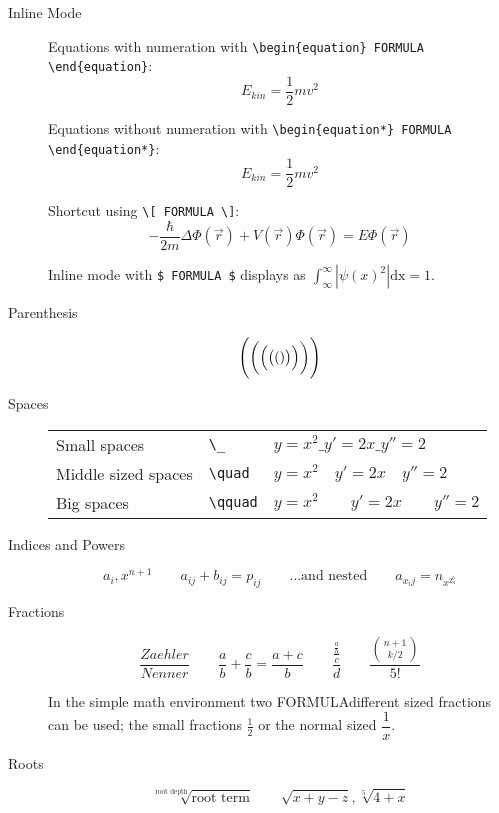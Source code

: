 \documentclass[10pt,a4paper]{scrartcl}
\begin{document}
\begin{description}

\item[Inline Mode]
Equations with numeration with \verb$\begin{equation} FORMULA \end{equation}$:
\begin{equation} 
E_{kin} = \frac 1 2 m v^2
\end{equation}

Equations without numeration with \verb$\begin{equation*} FORMULA \end{equation*}$:
\begin{equation*} 
E_{kin} = \frac 1 2 m v^2
\end{equation*}

Shortcut using \verb$\[ FORMULA \]$:
\[ -\frac{\hbar}{2m}\Delta\Phi(\vec r) + V(\vec r)\Phi(\vec r) = E\Phi(\vec r) \]

Inline mode with \verb|$ FORMULA $| displays as 
$\int_\infty^\infty |\psi(x)^2|\mathrm{dx} = 1$.

\item[Parenthesis]
\[ \Biggl( \biggl( \Bigl( \bigl( ( ) \bigr) \Bigr) \biggr) \Biggr) \]

\item[Spaces]
\begin{tabular}[t]{lll}
Small spaces        & \verb$\_$     & $ y=x^{2} \_ y'=2x \_  y''=2 $ \\
Middle sized spaces & \verb$\quad$  & $ y=x^{2} \quad y'=2x \quad  y''=2 $ \\
Big spaces          & \verb$\qquad$ & $ y=x^{2} \qquad y'=2x \qquad  y''=2 $
\end{tabular}

\item[Indices and Powers]
\[ a_i, x^{n+1} \qquad a_{ij} + b_{ij} = p_{ij} \qquad 
    \text{\ldots and nested} \qquad
    a_{x_ij} = n_{x^{2^b_n}} \]

\item[Fractions]
\[  \frac{Zaehler}{Nenner} \qquad 
    \frac{a}{b} + \frac{c}{b} = \frac{ a+c}{b} \qquad
    \frac{\frac{\frac{a}{b}}{c}}{d} \qquad
    \frac {{n+1 \choose k/2}} {5!} \]

\noindent In the simple math environment two FORMULAdifferent sized fractions can be 
used; the small fractions $\frac{1}{2}$ or the normal sized $\dfrac{1}{x}$.

\item[Roots]    
\[  \sqrt[\text{root depth}]{\text{root term}} \qquad
    \sqrt{x+y-z}, \sqrt[5]{4+x} \]
                

\end{description}
\end{document}
